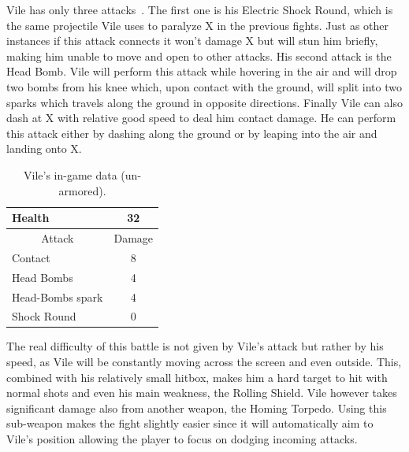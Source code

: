 Vile has only three attacks~\cite{wiki:Vile}. The first one is his Electric Shock Round, which is the same projectile Vile uses to paralyze X in the previous fights. Just as other instances if this attack connects it won't damage X but will stun him briefly, making him unable to move and open to other attacks. His second attack is the Head Bomb. Vile will perform this attack while hovering in the air and will drop two bombs from his knee which, upon contact with the ground, will split into two sparks which travels along the ground in opposite directions. Finally Vile can also dash at X with relative good speed to deal him contact damage. He can perform this attack either by dashing along the ground or by leaping into the air and landing onto X.

\begin{table}
	\centering
	\begin{tabular}[htp]{l c}
		\toprule
		Health  & 32\\
		\midrule
		\multicolumn{1}{c}{Attack} & \multicolumn{1}{c}{Damage}\\
		Contact & 8\\
		Head Bombs & 4\\
		Head-Bombs spark & 4\\
		Shock Round & 0\\
		\bottomrule
	\end{tabular}
	\caption{Vile's in-game data (un-armored). }
\end{table}


The real difficulty of this battle is not given by Vile's attack but rather by his speed, as Vile will be constantly moving across the screen and even outside. This, combined with his relatively small hitbox, makes him a hard target to hit with normal shots and even his main weakness, the Rolling Shield. Vile however takes significant damage also from another weapon, the Homing Torpedo. Using this sub-weapon makes the fight slightly easier since it will automatically aim to Vile's position allowing the player to focus on dodging incoming attacks.

